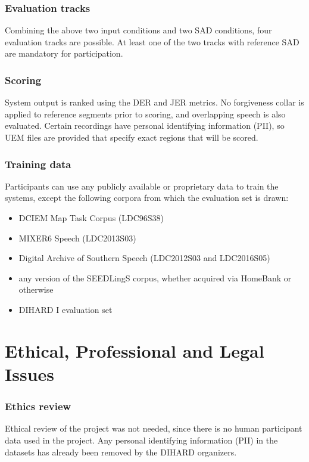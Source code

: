 	\subsubsection{Evaluation tracks}
	Combining the above two input conditions and two SAD conditions, four evaluation tracks are possible. At least one of the two tracks with reference SAD are mandatory for participation.
	
	\subsubsection{Scoring}
	System output is ranked using the DER and JER metrics. No forgiveness collar is applied to reference segments prior to scoring, and overlapping speech is also evaluated. Certain recordings have personal identifying information (PII), so UEM files are provided that specify exact regions that will be scored.
	
	\subsubsection{Training data}
	Participants can use any publicly available or proprietary data to train the systems, except the following corpora from which the evaluation set is drawn:
	\begin{itemize}
		\item DCIEM Map Task Corpus (LDC96S38)
		\item MIXER6 Speech (LDC2013S03)
		\item Digital Archive of Southern Speech (LDC2012S03 and LDC2016S05)
		\item any version of the SEEDLingS corpus, whether acquired via HomeBank or otherwise
		\item DIHARD I evaluation set
	\end{itemize}

\section{Ethical, Professional and Legal Issues}
	\subsubsection{Ethics review}
	Ethical review of the project was not needed, since there is no human participant data used in the project. Any personal identifying information (PII) in the datasets has already been removed by the DIHARD organizers.

